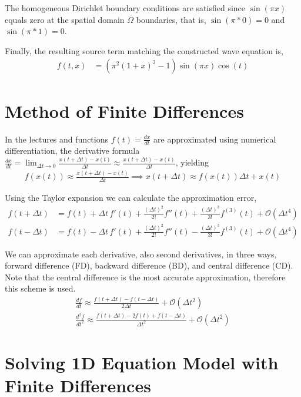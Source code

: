 \documentclass[11pt,a4paper]{article}
\begin{document}
The homogeneous Dirichlet boundary conditions are satisfied since $\sin(\pi x)$ equals zero at the spatial domain $\Omega$ boundaries, that is, $\sin(\pi * 0) = 0$ and $\sin(\pi * 1) = 0$.

Finally, the resulting source term matching the constructed wave equation is,
\begin{align}
    f(t, x) &= (\pi^{2} (1+x)^{2}-1) \sin(\pi x) \cos(t)
\end{align}

\section{Method of Finite Differences}

In the lectures \cite{brunton2022_numerical_diff_1} and \cite{brunton2022_numerical_diff_2} functions $f(t) = \frac{dx}{dt}$ are approximated using numerical differentiation, the derivative formula $\frac{dx}{dt}= \lim_{\Delta t \rightarrow0} \frac{x(t+\Delta t)-x(t)}{\Delta t} \approx\frac{x(t+\Delta t)-x(t)}{\Delta t}$, yielding
\begin{align}
    f(x(t)) \approx \frac{x(t+\Delta t)-x(t)}{\Delta t} \implies x(t +\Delta t) \approx f(x(t)) \Delta t + x(t)
\end{align}

Using the Taylor expansion we can calculate the approximation error,
\begin{align}
    f(t + \Delta t) &= f(t) + \Delta t \, f'(t) + \frac{(\Delta t)^2}{2!} f''(t) + \frac{(\Delta t)^3}{3!} f^{(3)}(t) + \mathcal{O}(\Delta t^4) \\[8pt]
    f(t - \Delta t) &= f(t) - \Delta t \, f'(t) + \frac{(\Delta t)^2}{2!} f''(t) - \frac{(\Delta t)^3}{3!} f^{(3)}(t) + \mathcal{O}(\Delta t^4)
\end{align}

We can approximate each derivative, also second derivatives, in three ways, forward difference (FD), backward difference (BD), and central difference (CD). Note that the central difference is the most accurate approximation, therefore this scheme is used.
\begin{align}
        \frac{df}{dt} \approx \frac{f(t + \Delta t) - f(t - \Delta t)}{2\Delta t} + \mathcal{O}(\Delta t^{2}) \\
         \frac{d^{2}f}{dt^{2}} \approx \frac{f(t + \Delta t) - 2f(t) + f(t - \Delta t)}{\Delta t^{2}} + \mathcal{O}(\Delta t^{2})
\end{align}        

\section{Solving 1D Equation Model with Finite Differences}
\end{document}
